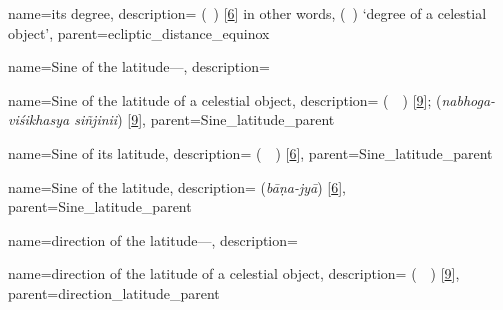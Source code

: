 

{
        name={its degree},
        description={ (\daraji\idafavowel\ \uy) [\hyperlink{PEpass6}{6}]\newline
        in other words,  (\daraji\idafavowel\ \kawkab) `degree of a celestial object'},
        parent={ecliptic_distance_equinox}
} 

{
        name={Sine of the latitude---},
        description={\phantom{x}\nopagebreak}
}
    
{
        name={Sine of the latitude of a celestial object},
        description={ (\jayb\idafaconsonant\ \ard\idafaconsonant\ \kawkab) [\hyperlink{PEpass9}{9}];  (\textit{nabhoga-viśikhasya siñjinii}) [\hyperlink{SEpass9}{9}]},
        parent={Sine_latitude_parent}
}

{
        name={Sine of its latitude},
        description={ (\jayb\idafaconsonant\ \ard\idafaconsonant\ \uy) [\hyperlink{PEpass6}{6}]},    
        parent={Sine_latitude_parent}
}

{
        name={Sine of the latitude},
        description={  (\textit{bāṇa-jyā}) [\hyperlink{SEpass6}{6}]},
        parent={Sine_latitude_parent}
}

{       name={direction of the latitude---},
        description={\phantom{x}\nopagebreak}
}

{
        name={direction of the latitude of a celestial object},
        description={ (\jahat\idafaconsonant\ \ard\idafaconsonant\ \kawkab) [\hyperlink{PEpass9}{9}]},
        parent={direction_latitude_parent}
}

